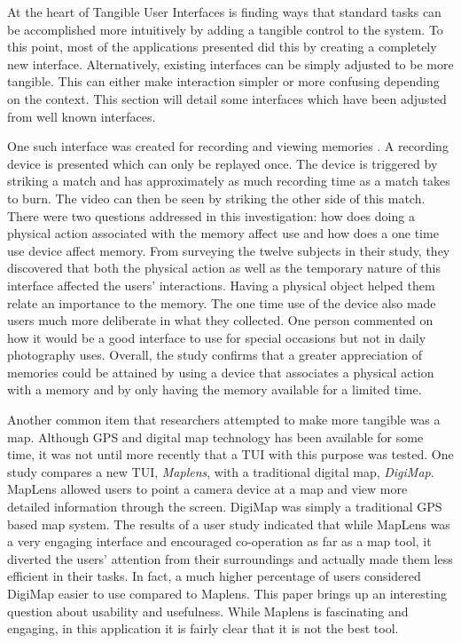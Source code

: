 At the heart of Tangible User Interfaces is finding ways that standard tasks can be accomplished more intuitively by adding a tangible control to the system.  To this point, most of the applications presented did this by creating a completely new interface.  Alternatively, existing interfaces can be simply adjusted to be more tangible.  This can either make interaction simpler or more confusing depending on the context.  This section will detail some interfaces which have been adjusted from well known interfaces.

One such interface was created for recording and viewing memories \cite{1520342}. A recording device is presented which can only be replayed once. The device is triggered by striking a match and has approximately as much recording time as a match takes to burn. The video can then be seen by striking the other side of this match. There were two questions addressed in this investigation: how does doing a physical action associated with the memory affect use and how does a one time use device affect memory. From surveying the twelve subjects in their study, they discovered that both the physical action as well as the temporary nature of this interface affected the users' interactions. Having a physical object helped them relate an importance to the memory. The one time use of the device also made users much more deliberate in what they collected. One person commented on how it would be a good interface to use for special occasions but not in daily photography uses. Overall, the study confirms that a greater appreciation of memories could be attained by using a device that associates a physical action with a memory and by only having the memory available for a limited time. 

Another common item that researchers attempted to make more tangible was a map.  Although GPS and digital map technology has been available for some time, it was not until more recently that a TUI with this purpose was tested.  One study compares a new TUI, \emph{Maplens}, with a traditional digital map, \emph{DigiMap}. MapLens \cite{1518991} allowed users to point a camera device at a map and view more detailed information through the screen. DigiMap was simply a traditional GPS based map system.  The results of a user study indicated that while MapLens was a very engaging interface and encouraged co-operation as far as a map tool, it diverted the users' attention from their surroundings and actually made them less efficient in their tasks. In fact, a much higher percentage of users considered DigiMap easier to use compared to Maplens. This paper brings up an interesting question about usability and usefulness. While Maplens is fascinating and engaging, in this application it is fairly clear that it is not the best tool.

